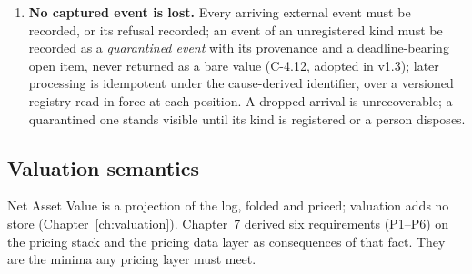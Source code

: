 \documentclass[11pt,a4paper]{article}
\begin{document}
\begin{enumerate}[label=\textbf{M\arabic*.}, ref=M\arabic*, leftmargin=*, itemsep=3pt]
  sufficiency obligation of Chapter~\ref{ch:collateral} and Chapter~\ref{ch:invariants}.
\item \textbf{No captured event is lost.} Every arriving external event must be recorded,
  or its refusal recorded; an event of an unregistered kind must be recorded as a
  \emph{quarantined event} with its provenance and a deadline-bearing open item, never
  returned as a bare value (C-4.12, adopted in v1.3); later processing is idempotent
  under the cause-derived identifier, over a versioned registry read in force at each
  position. A dropped arrival is unrecoverable; a quarantined one stands visible until its
  kind is registered or a person disposes.
\end{enumerate}

\subsection{Valuation semantics}

Net Asset Value is a projection of the log, folded and priced; valuation adds no store
(Chapter~\ref{ch:valuation}). Chapter~7 derived six requirements (P1--P6) on the pricing
stack and the pricing data layer as consequences of that fact. They are the minima any
pricing layer must meet.
\end{document}
